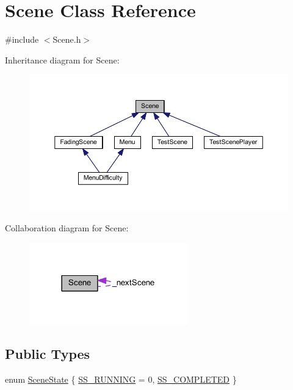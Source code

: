 \hypertarget{class_scene}{
\section{Scene Class Reference}
\label{d6/db5/class_scene}
}


{\ttfamily \#include $<$Scene.h$>$}



Inheritance diagram for Scene:
\nopagebreak
\begin{figure}[H]
\begin{center}
\leavevmode
\includegraphics[width=400pt]{d8/de6/class_scene__inherit__graph}
\end{center}
\end{figure}


Collaboration diagram for Scene:
\nopagebreak
\begin{figure}[H]
\begin{center}
\leavevmode
\includegraphics[width=194pt]{d4/d7f/class_scene__coll__graph}
\end{center}
\end{figure}
\subsection*{Public Types}
\begin{DoxyCompactItemize}
\item 
enum \hyperlink{class_scene_a390db78d3a8e0fa83e861074e8690e87}{SceneState} \{ \hyperlink{class_scene_a390db78d3a8e0fa83e861074e8690e87a611c1c6bfa45ffad37f37bb811edfe2b}{SS\_\-RUNNING} =  0, 
\hyperlink{class_scene_a390db78d3a8e0fa83e861074e8690e87a267743ea3f16b889bf84127cb107ab9b}{SS\_\-COMPLETED}
 \}
\end{DoxyCompactItemize}
